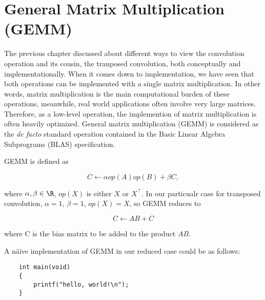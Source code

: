 
\chapter{General Matrix Multiplication (GEMM)}

The previous chapter discussed about different ways to view the convolution operation and its cousin,
the tranposed convolution, both conceptually and implementationally. When it comes down to implementation,
we have seen that both operations can be implemented with a single matrix multiplication. In other words,
matrix multiplication is the main computational burden of these operations, meanwhile, real world applications
often involve very large matrices. Therefore, as a low-level operation, the implemention of matrix
multiplication is often heavily optimized. General matrix multiplication (GEMM) is considered as the
\textit{de facto} standard operation contained in the Basic Linear Algebra Subprograms (BLAS)
specification.

GEMM is defined as

$$C \leftarrow \alpha op(A) op(B) + \beta C,$$

where $\alpha, \beta \in \R$, $op(X)$ is either $X$ or $X^\intercal$. In our particualr case for transposed convolution, $\alpha = 1$, $\beta = 1$, $op(X) = X$, so GEMM reduces to

$$C \leftarrow A B + C$$

where C is the bias matrix to be added to the product $A B$.

A näive implementation of GEMM in our reduced case could be as follows:

\begin{code}
  \begin{verbatim}
    int main(void)
    {
        printf("hello, world!\n");
    }
  \end{verbatim}
  \label{code:naivegemm}
\end{code}

\clearpage %

